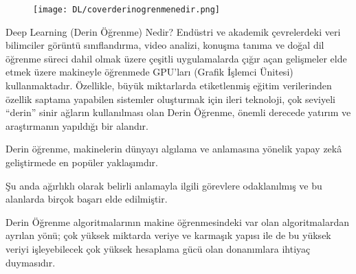 \documentclass{beamer}                                                                                          %
\begin{document}
    \begin{frame}{}
        \begin{center}
            \begin{figure}
                \vspace*{-7mm}
                \hspace*{-18.5 pt}
                \centering
                \texttt{[image: DL/coverderinogrenmenedir.png]}
            \end{figure}
        \end{center}
    \end{frame}
    
    
    \begin{frame}{Deep Learning (Derin Öğrenme) Nedir?}
        \justifying
	        \color{myred1} \color{black}Endüstri ve akademik çevrelerdeki veri bilimciler görüntü sınıflandırma, video analizi, konuşma tanıma ve doğal dil öğrenme süreci dahil olmak üzere çeşitli uygulamalarda çığır açan gelişmeler elde etmek üzere makineyle öğrenmede GPU’ları (Grafik İşlemci Ünitesi) kullanmaktadır. Özellikle, büyük miktarlarda etiketlenmiş eğitim verilerinden özellik saptama yapabilen sistemler oluşturmak için ileri teknoloji, çok seviyeli “derin” sinir ağların kullanılması olan Derin Öğrenme, önemli derecede yatırım ve araştırmanın yapıldığı bir alandır. 
	\end{frame}
	
    
    \begin{frame}
        \justifying
            \color{myred1} \color{black}Derin öğrenme, makinelerin dünyayı algılama ve anlamasına yönelik yapay zekâ geliştirmede en popüler yaklaşımdır.\par \vspace{15}
            \color{myred1} \color{black}Şu anda ağırlıklı olarak belirli anlamayla ilgili görevlere odaklanılmış ve bu alanlarda birçok başarı elde edilmiştir.\par \vspace{15}
            \color{myred1} \color{black}
            Derin Öğrenme algoritmalarının makine öğrenmesindeki var olan algoritmalardan ayrılan yönü; çok yüksek miktarda veriye ve karmaşık yapısı ile de bu yüksek veriyi işleyebilecek çok yüksek hesaplama gücü olan donanımlara ihtiyaç duymasıdır. 
    \end{frame}
    
\end{document}
